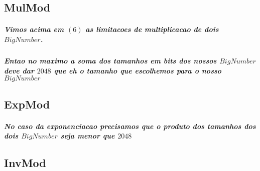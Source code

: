 \documentclass[12pt,twoside, a4paper, twocolumn]{article}
\begin{document}
\subsection{MulMod}

\subparagraph*{Vimos acima em $(6)$ as limitacoes de multiplicacao de dois $BigNumber$.}

\subparagraph*{Entao no maximo a soma dos tamanhos em bits dos nossos $BigNumber$ deve dar $2048$ que eh o tamanho que escolhemos para o nosso $BigNumber$}

\subsection{ExpMod}

\subparagraph*{No caso da exponenciacao precisamos que o produto dos tamanhos dos dois $BigNumber$ seja menor que $2048$ }

\subsection{InvMod}
\end{document}
